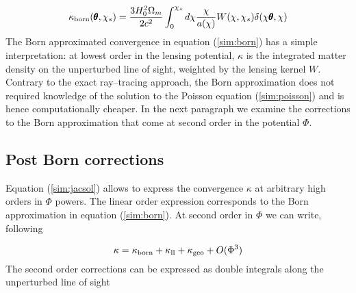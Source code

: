 \documentclass[reprint,aps,prd,superscriptaddress,showkeys,showpacs]{revtex4-1}
\newcommand\pt{\pmb{\theta}}
\begin{document}
\begin{equation}
\label{sim:born}
\kappa_{\rm born}(\pt,\chi_s) = \frac{3H_0^2\Omega_m}{2c^2}\int_0^{\chi_s} d\chi\frac{\chi}{a(\chi)} W(\chi,\chi_s)\delta(\chi\pt,\chi)
\end{equation}
%
The Born approximated convergence in equation (\ref{sim:born}) has a simple interpretation: at lowest order in the lensing potential, $\kappa$ is the integrated matter density on the unperturbed line of sight, weighted by the lensing kernel $W$. Contrary to the exact ray--tracing approach, the Born approximation does not required knowledge of the solution to the Poisson equation (\ref{sim:poisson}) and is hence computationally cheaper. In the next paragraph we examine the corrections to the Born approximation that come at second order in the potential $\Phi$.  

\subsection{Post Born corrections}
Equation (\ref{sim:jacsol}) allows to express the convergence $\kappa$ at arbitrary high orders in $\Phi$ powers. The linear order expression corresponds to the Born approximation in equation (\ref{sim:born}). At second order in $\Phi$ we can write, following \citep{WLBispectrumDodelson}

\begin{equation}
\label{sim:pb2}
\kappa = \kappa_{\rm born} + \kappa_{\rm ll} + \kappa_{\rm geo} + O(\Phi^3)
\end{equation}
%
The second order corrections can be expressed as double integrals along the unperturbed line of sight
\end{document}
